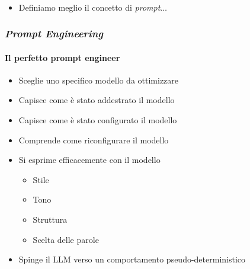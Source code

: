 \begin{frame}[t]
{\begin{minipage}[t]{\textwidth}
\begin{figure}
        \end{figure}
    \end{minipage}
    \\\vspace*{.3cm}
    \begin{minipage}[t]{\textwidth}
        \begin{itemize}[leftmargin=10pt,align=right]
            \item[\alert{\faArrowCircleRight}] Definiamo meglio il concetto di \emph{prompt}$\ldots$
        \end{itemize}
    \end{minipage}
}
\end{frame}
%
\begin{frame}[t] \frametitle{\emph{Prompt Engineering}}
\framesubtitle{Il perfetto prompt engineer}
	{\footnotesize
	    \begin{minipage}[t]{\textwidth}
			\begin{minipage}[t]{0.6\textwidth}
	    		\begin{itemize}[leftmargin=10pt,align=right]
					\onslide<1->\item[\alert{\faArrowCircleRight}] Sceglie uno \alert{specifico} modello da ottimizzare
					\onslide<2->\item[\alert{\faArrowCircleRight}] Capisce come è stato addestrato il modello
					\onslide<3->\item[\alert{\faArrowCircleRight}] Capisce come è stato configurato il modello
                    \item[\alert{\faArrowCircleRight}] Comprende come riconfigurare il modello
					\onslide<5->\item[\alert{\faArrowCircleRight}] Si esprime efficacemente con il modello
                    \begin{itemize}[leftmargin=10pt,align=right]
                        \item[\alert{\faArrowCircleRight}] Stile
                        \item[\alert{\faArrowCircleRight}] Tono
                        \item[\alert{\faArrowCircleRight}] Struttura
                        \item[\alert{\faArrowCircleRight}] Scelta delle parole
                    \end{itemize}
                    \item[\alert{\faExclamationTriangle}] Spinge il LLM verso un comportamento \alert{pseudo-deterministico}  

\end{itemize}
\end{minipage}
\end{minipage}}
\end{frame}
